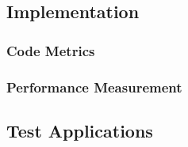 \subsection{Implementation}
	\subsubsection{Code Metrics}
	\subsubsection{Performance Measurement}
\subsection{Test Applications}